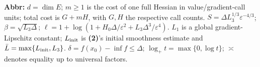 \begin{table}[tp]
\begin{threeparttable}
\begin{tabularx}{\linewidth}{@{}>{\raggedright\arraybackslash}p{0.20\linewidth}>{\raggedright\arraybackslash}p{0.32\linewidth}>{\raggedright\arraybackslash}p{0.25\linewidth}>{\raggedright\arraybackslash}X@{}}
\bottomrule
\end{tabularx}
\begin{tablenotes}[flushleft]\footnotesize
\item[] \textbf{Abbr:} $d=\dim E$; $m\ge1$ is the cost of one full Hessian in value/gradient-call units; total cost is $G+mH$, with $G,H$ the respective call counts. $S=\Delta L_3^{1/3}\varepsilon^{-4/3}$; $\beta=\sqrt{L_3\Delta}$; $\ell=1+\log(1+H_0\Delta/\varepsilon^2+L_3\Delta^3/\varepsilon^4)$. $L_1$ is a global gradient-Lipschitz constant; $L_{\rm init}$ is \textbf{(2)}'s initial smoothness estimate and $\bar L=\max\{L_{\rm init},L_3\}$. $\delta=f(x_0)-\inf f\le\Delta$; $\log_+t=\max\{0,\log t\}$; $\asymp$ denotes equality up to universal factors.
\end{tablenotes}
\end{threeparttable}
\end{table}
\clearpage
